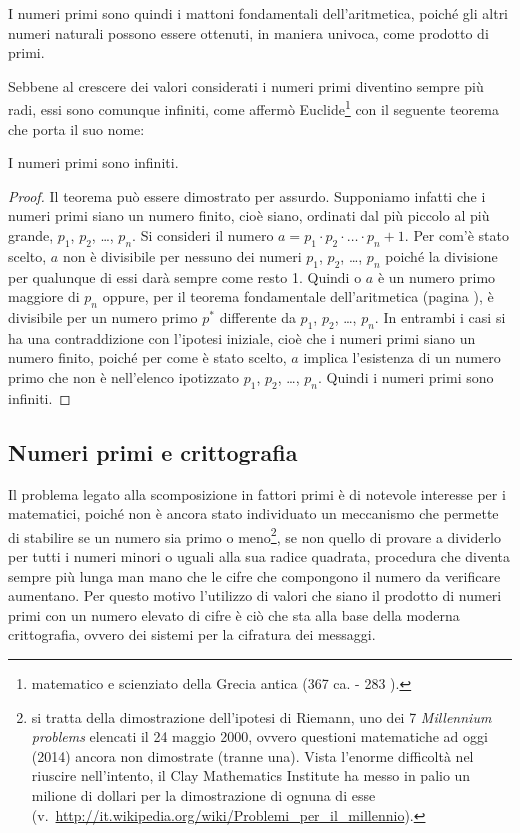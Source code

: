 I numeri primi sono quindi i mattoni fondamentali dell'aritmetica, poiché gli altri numeri naturali possono essere ottenuti, in maniera univoca, come prodotto di primi.

Sebbene al crescere dei valori considerati i numeri primi diventino sempre più radi, essi sono comunque infiniti, come affermò Euclide\footnote{matematico e scienziato della Grecia antica (367 \aC{} ca. - 283 \aC).} con il seguente teorema che porta il suo nome:
\begin{teorema}[di Euclide]
I numeri primi sono infiniti.
\end{teorema}

\begin{proof}
Il teorema può essere dimostrato per assurdo.
Supponiamo infatti che i numeri primi siano un numero finito, cioè siano, ordinati dal più piccolo al più grande, $p_1$, $p_2$, \ldots{}, $p_n$. Si consideri il numero $a=p_1\cdot p_2\cdot \ldots{}\cdot p_n+1$. Per com'è stato scelto, $a$ non è divisibile per nessuno dei numeri $p_1$, $p_2$, \ldots{}, $p_n$ poiché la divisione per qualunque di essi darà sempre come resto 1. Quindi o $a$ è un numero primo maggiore di $p_n$ oppure, per il teorema fondamentale dell'aritmetica (pagina \pageref{th:fondamentale_dell_aritmetica}), è divisibile per un numero primo $p^*$ differente da $p_1$, $p_2$, \ldots{}, $p_n$. In entrambi i casi si ha una contraddizione con l'ipotesi iniziale, cioè che i numeri primi siano un numero finito, poiché per come è stato scelto, $a$ implica l'esistenza di un numero primo che non è nell'elenco ipotizzato $p_1$, $p_2$, \ldots, $p_n$. Quindi i numeri primi sono infiniti.
\end{proof}

\ovalbox{\risolvii \ref{ese:1.19}, \ref{ese:1.20}}


\subsection{Numeri primi e crittografia}

Il problema legato alla scomposizione in fattori primi è di notevole interesse per i matematici, poiché non è ancora stato individuato un meccanismo che permette di stabilire se un numero sia primo o meno\footnote{si tratta della dimostrazione dell'ipotesi di Riemann, uno dei 7 \emph{Millennium problems} elencati il 24 maggio 2000, ovvero questioni matematiche ad oggi (2014) ancora non dimostrate (tranne una). Vista l'enorme difficoltà nel riuscire nell'intento, il Clay Mathematics Institute ha messo in palio un milione di dollari per la dimostrazione di ognuna di esse (v.~\url{http://it.wikipedia.org/wiki/Problemi_per_il_millennio}).}, se non quello di provare a dividerlo per tutti i numeri minori o uguali alla sua radice quadrata, procedura che diventa sempre più lunga man mano che le cifre che compongono il numero da verificare aumentano. Per questo motivo l'utilizzo di valori che siano il prodotto di numeri primi con un numero elevato di cifre è ciò che sta alla base della moderna crittografia, ovvero dei sistemi per la cifratura dei messaggi.

